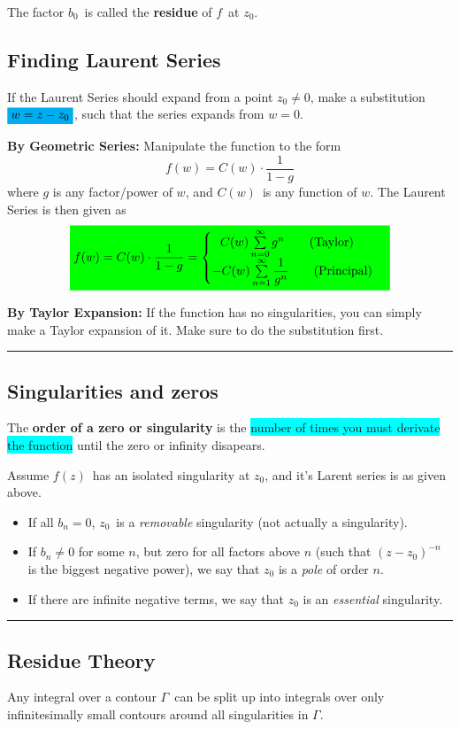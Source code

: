 \documentclass[10pt,a4paper]{article}
\newcommand{\holine}{\rule{286pt}{1pt}}
\newcommand{\gr}[1]{\colorbox{green}{$\displaystyle #1$}}
\newcommand{\bl}[1]{\colorbox{cyan}{$\displaystyle #1$}}
\newcommand{\bll}{\colorbox{cyan}}
\begin{document}
\begin{multicols}{2}
The factor $b_0$ is called the \textbf{residue} of $f$ at $z_0$.

\subsection*{Finding Laurent Series}
If the Laurent Series should expand from a point $z_0 \neq 0$, make a substitution $\bl{w = z - z_0}$, such that the series expands from $w=0$.

\textbf{By Geometric Series:} Manipulate the function to the form
\[
    f(w) = C(w)\cdot \frac{1}{1-g}
\]
    where $g$ is any factor/power of $w$, and $C(w)$ is any function of $w$.
    The Laurent Series is then given as
\[
\gr{
    f(w) = C(w)\cdot \frac{1}{1-g} = \begin{cases} \ \ C(w)\sum\limits_{n=0}^\infty g^n \quad\quad \text{(Taylor)} \\ -C(w)\sum\limits_{n=1}^\infty\dfrac{1}{g^n} \quad\quad \text{(Principal)} \end{cases}
}
\]

\textbf{By Taylor Expansion:} If the function has no singularities, you can simply make a Taylor expansion of it. Make sure to do the substitution first.


\holine
\subsection*{Singularities and zeros}
The \textbf{order of a zero or singularity} is the \bll{number of times you must derivate the function} until the zero or infinity disapears.

Assume $f(z)$ has an isolated singularity at $z_0$, and it's Larent series is as given above.
\begin{itemize}
    \item If all $b_n = 0$, $z_0$ is a \textit{removable} singularity (not actually a singularity).
    \item If $b_n \neq 0$ for some $n$, but zero for all factors above $n$ (such that $(z-z_0)^{-n}$ is the biggest negative power), we say that $z_0$ is a \textit{pole} of order $n$.
    \item If there are infinite negative terms, we say that $z_0$ is an \textit{essential} singularity.
\end{itemize}


\holine
\subsection*{Residue Theory}
Any integral over a contour $\Gamma$ can be split up into integrals over only infinitesimally small contours around all singularities in $\Gamma$.


\end{multicols}
\end{document}

